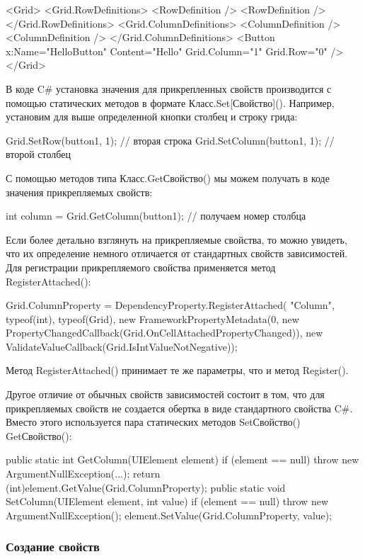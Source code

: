<Grid>
    <Grid.RowDefinitions>
        <RowDefinition />
        <RowDefinition />
    </Grid.RowDefinitions>
    <Grid.ColumnDefinitions>
        <ColumnDefinition />
        <ColumnDefinition />
    </Grid.ColumnDefinitions>
    <Button x:Name="HelloButton" Content="Hello" Grid.Column="1" Grid.Row="0" />
</Grid>

В коде C# установка значения для прикрепленных свойств производится с помощью статических методов в формате Класс.Set[Свойство](). Например, установим для выше определенной кнопки столбец и строку грида:

Grid.SetRow(button1, 1); // вторая строка
Grid.SetColumn(button1, 1); // второй столбец

С помощью методов типа Класс.GetСвойство() мы можем получать в коде значения прикрепляемых свойств:

int column = Grid.GetColumn(button1); // получаем номер столбца


Если более детально взглянуть на прикрепляемые свойства, то можно увидеть, что их определение немного отличается от стандартных свойств зависимостей. Для регистрации прикрепляемого свойства применяется метод RegisterAttached():

Grid.ColumnProperty = DependencyProperty.RegisterAttached(
                        "Column", 
                        typeof(int), 
                        typeof(Grid), 
                        new FrameworkPropertyMetadata(0, 
                            new PropertyChangedCallback(Grid.OnCellAttachedPropertyChanged)), 
                        new ValidateValueCallback(Grid.IsIntValueNotNegative));
                        
Метод RegisterAttached() принимает те же параметры, что и метод Register().

Другое отличие от обычных свойств зависимостей состоит в том, что для прикрепляемых свойств не создается обертка в виде стандартного свойства C#. Вместо этого используется пара статических методов SetСвойство() GetСвойство():

public static int GetColumn(UIElement element)
{
    if (element == null)
    {
        throw new ArgumentNullException(...);
    }
    return (int)element.GetValue(Grid.ColumnProperty);
}
public static void SetColumn(UIElement element, int value)
{
    if (element == null)
    {
        throw new ArgumentNullException();
    }
    element.SetValue(Grid.ColumnProperty, value);
}

\subsubsection{Создание свойств}

